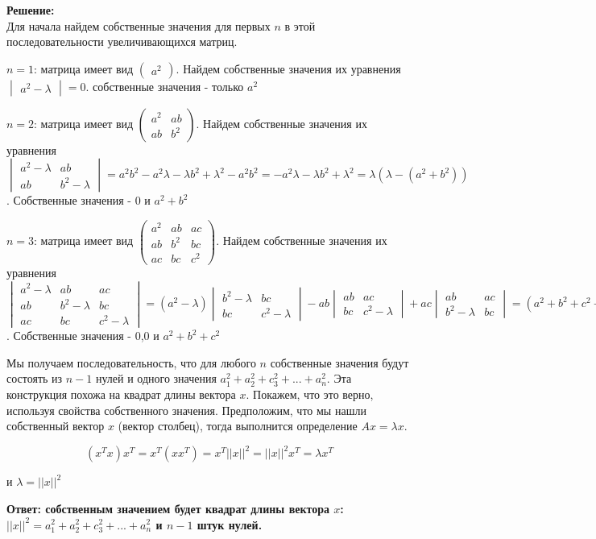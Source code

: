 \documentclass[a4paper,12pt]{article}
\begin{document}
\begin{enumerate}
\textbf{Решение:}\\
Для начала найдем собственные значения для первых $n$ в этой последовательности увеличивающихся матриц.

$n=1$: матрица имеет вид $
\begin{pmatrix}
a^2
\end{pmatrix}
$. Найдем собственные значения их уравнения $\begin{vmatrix}
a^2-\lambda
\end{vmatrix} =0$. собственные значения - только $a^2$

$n=2$: матрица имеет вид $
\begin{pmatrix}
a^2&ab\\
ab&b^2
\end{pmatrix}
$. Найдем собственные значения их уравнения $\begin{vmatrix}
a^2-\lambda&ab\\
ab&b^2-\lambda
\end{vmatrix} =a^2b^2-a^2\lambda-{\lambda} b^2 + \lambda^2 -a^2b^2=-a^2\lambda-{\lambda} b^2 + \lambda^2=\lambda(\lambda-(a^2+b^2))$. Собственные значения - 0 и $a^2+b^2$

$n=3$: матрица имеет вид $
\begin{pmatrix}
a^2&ab&ac\\
ab&b^2&bc\\
ac&bc&c^2
\end{pmatrix}
$. Найдем собственные значения их уравнения $\begin{vmatrix}
a^2-\lambda&ab&ac\\
ab&b^2-\lambda&bc\\
ac&bc&c^2-\lambda
\end{vmatrix} =(a^2-\lambda)\begin{vmatrix}
b^2-\lambda&bc\\
bc&c^2-\lambda
\end{vmatrix}-ab\begin{vmatrix}
ab&ac\\
bc&c^2-\lambda
\end{vmatrix}+ac\begin{vmatrix}
ab&ac\\
b^2-\lambda&bc
\end{vmatrix}=(a^2 + b^2 + c^2 - \lambda) \lambda^2=0$. Собственные значения - 0,0 и $a^2 + b^2 + c^2$

Мы получаем последовательность, что для любого $n$ собственные значения будут состоять из $n-1$ нулей и одного значения $a_1^2 + a_2^2 + c_3^2+...+a^2_n$.
Эта конструкция похожа на квадрат длины вектора $x$. Покажем, что это верно, используя свойства собственного значения. Предположим, что мы нашли собственный вектор $x$ (вектор столбец), тогда выполнится определение $Ax=\lambda x$.


$$(x^Tx)x^T = x^T(xx^T)=x^T{||x||}^2={||x||}^2x^T=\lambda x^T$$

и $\lambda={||x||}^2$

\textbf{Ответ: собственным значением будет квадрат длины вектора $x$: ${||x||}^2=a_1^2 + a_2^2 + c_3^2+...+a^2_n$ и $n-1$ штук нулей.}

\end{enumerate}
\end{document}
